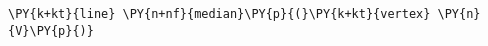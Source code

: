 \begin{Verbatim}[commandchars=\\\{\}]
    \PY{k+kt}{line} \PY{n+nf}{median}\PY{p}{(}\PY{k+kt}{vertex} \PY{n}{V}\PY{p}{)}
\end{Verbatim}
